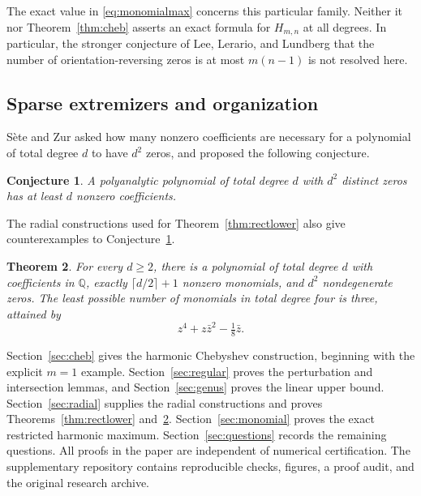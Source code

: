 \documentclass[a4paper]{amsart}
\newtheorem{thm}{Theorem}
\newtheorem{conjecture}[thm]{Conjecture}
\theoremstyle{remark}
\newcommand{\Q}{\mathbb Q}
\begin{document}
The exact value in \eqref{eq:monomialmax} concerns this particular
family. Neither it nor Theorem~\ref{thm:cheb} asserts an exact formula
for \(H_{m,n}\) at all degrees. In particular, the stronger conjecture
of Lee, Lerario, and Lundberg \cite{LLL15} that the number of
orientation-reversing zeros is at most \(m(n-1)\) is not resolved here.

\subsection{Sparse extremizers and organization}
S\`ete and Zur \cite[Remark 4.4]{SZ24} asked how many nonzero
coefficients are necessary for a polynomial of total degree \(d\)
to have \(d^2\) zeros, and proposed the following conjecture.

\begin{conjecture}\label{conj:sparse}
A polyanalytic polynomial of total degree \(d\) with \(d^2\)
distinct zeros has at least \(d\) nonzero coefficients.
\end{conjecture}

The radial constructions used for Theorem~\ref{thm:rectlower}
also give counterexamples to Conjecture~\ref{conj:sparse}.

\begin{thm}\label{thm:sparse}
For every \(d\ge2\), there is a polynomial of total degree \(d\)
with coefficients in \(\Q\), exactly \(\lceil d/2\rceil+1\)
nonzero monomials, and \(d^2\) nondegenerate zeros.
The least possible number of monomials in total degree four
is three, attained by
\begin{equation}\label{eq:quartic}
 z^4+z\bar z^2-\tfrac18\bar z.
\end{equation}
\end{thm}

Section~\ref{sec:cheb} gives the harmonic Chebyshev construction,
beginning with the explicit \(m=1\) example.
Section~\ref{sec:regular} proves the perturbation and intersection
lemmas, and Section~\ref{sec:genus} proves the linear upper bound.
Section~\ref{sec:radial} supplies the radial constructions and proves
Theorems~\ref{thm:rectlower} and~\ref{thm:sparse}.
Section~\ref{sec:monomial} proves the exact restricted harmonic
maximum. Section~\ref{sec:questions} records the remaining questions.
All proofs in the paper are independent of numerical certification.
The supplementary repository \cite{Supplement} contains reproducible
checks, figures, a proof audit, and the original research archive.
\end{document}

